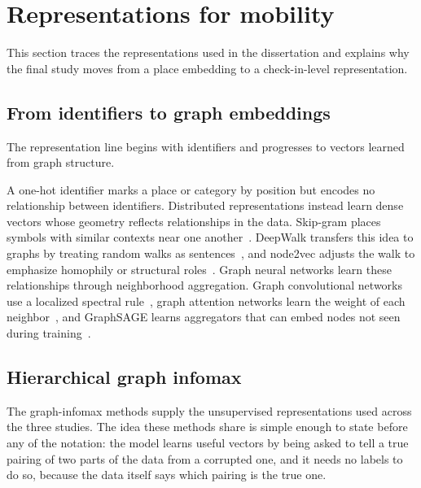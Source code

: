 \section{Representations for mobility}
\label{sec:fund:repr}

This section traces the representations used in the dissertation and explains why the
final study moves from a place embedding to a check-in-level representation.

\subsection{From identifiers to graph embeddings}

The representation line begins with identifiers and progresses to vectors learned
from graph structure.


A one-hot identifier marks a place or category by position but encodes no relationship
between identifiers. Distributed representations instead learn dense vectors whose
geometry reflects relationships in the data. Skip-gram places symbols with similar
contexts near one another~\cite{mikolov2013word2vec}. DeepWalk transfers this idea to
graphs by treating random walks as sentences~\cite{perozzi2014deepwalk}, and node2vec
adjusts the walk to emphasize homophily or structural
roles~\cite{grover2016node2vec}. Graph neural networks learn these relationships
through neighborhood aggregation. Graph convolutional networks use a localized
spectral rule~\cite{kipf2017gcn}, graph attention networks learn the weight of each
neighbor~\cite{velivckovic2017graph}, and GraphSAGE learns aggregators that can embed
nodes not seen during training~\cite{hamilton2017graphsage}.

\subsection{Hierarchical graph infomax}

The graph-infomax methods supply the unsupervised representations used across the
three studies. The idea these methods share is simple enough to state before any of
the notation: the model learns useful vectors by being asked to tell a true pairing of
two parts of the data from a corrupted one, and it needs no labels to do so, because
the data itself says which pairing is the true one.

